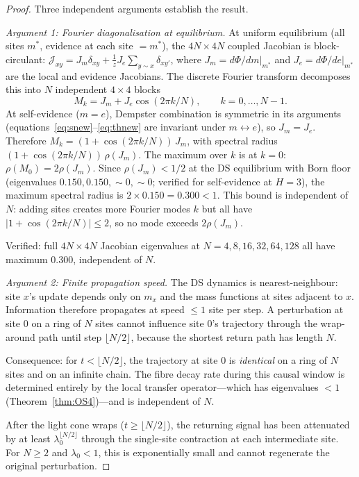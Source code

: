 \documentclass[11pt,a4paper]{article}
\theoremstyle{definition}
\theoremstyle{remark}
\begin{document}
\begin{proof}
Three independent arguments establish the result.

\emph{Argument 1: Fourier diagonalisation at equilibrium.} At uniform equilibrium (all sites $m^*$, evidence at each site $=m^*$), the $4N\times 4N$ coupled Jacobian is block-circulant: $\mathcal{J}_{xy}=J_m\delta_{xy}+\frac{1}{z}J_e\sum_{y\sim x}\delta_{xy'}$, where $J_m=d\Phi/dm|_{m^*}$ and $J_e=d\Phi/de|_{m^*}$ are the local and evidence Jacobians. The discrete Fourier transform decomposes this into $N$ independent $4\times 4$ blocks
\[
M_k=J_m+J_e\cos(2\pi k/N),\qquad k=0,\ldots,N-1.
\]
At self-evidence ($m=e$), Dempster combination is symmetric in its arguments (equations~\ref{eq:snew}--\ref{eq:thnew} are invariant under $m\leftrightarrow e$), so $J_m=J_e$. Therefore $M_k=(1+\cos(2\pi k/N))\,J_m$, with spectral radius $(1+\cos(2\pi k/N))\,\rho(J_m)$. The maximum over $k$ is at $k=0$: $\rho(M_0)=2\rho(J_m)$. Since $\rho(J_m)<1/2$ at the DS equilibrium with Born floor (eigenvalues $0.150, 0.150, \sim\!0, \sim\!0$; verified for self-evidence at $H=3$), the maximum spectral radius is $2\times 0.150=0.300<1$. This bound is independent of $N$: adding sites creates more Fourier modes $k$ but all have $|1+\cos(2\pi k/N)|\leq 2$, so no mode exceeds $2\rho(J_m)$.

Verified: full $4N\times 4N$ Jacobian eigenvalues at $N=4,8,16,32,64,128$ all have maximum $0.300$, independent of $N$.

\emph{Argument 2: Finite propagation speed.} The DS dynamics is nearest-neighbour: site $x$'s update depends only on $m_x$ and the mass functions at sites adjacent to $x$. Information therefore propagates at speed $\leq 1$ site per step. A perturbation at site $0$ on a ring of $N$ sites cannot influence site $0$'s trajectory through the wrap-around path until step $\lfloor N/2\rfloor$, because the shortest return path has length $N$.

Consequence: for $t<\lfloor N/2\rfloor$, the trajectory at site $0$ is \emph{identical} on a ring of $N$ sites and on an infinite chain. The fibre decay rate during this causal window is determined entirely by the local transfer operator---which has eigenvalues $<1$ (Theorem~\ref{thm:OS4})---and is independent of $N$.

After the light cone wraps ($t\geq\lfloor N/2\rfloor$), the returning signal has been attenuated by at least $\lambda_0^{\lfloor N/2\rfloor}$ through the single-site contraction at each intermediate site. For $N\geq 2$ and $\lambda_0<1$, this is exponentially small and cannot regenerate the original perturbation.


\end{proof}
\end{document}
